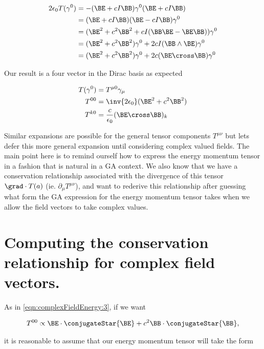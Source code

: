 \begin{align*}
2 \epsilon_0 T(\gamma^0) 
&= -(\BE + c I \BB) \gamma^0 (\BE + c I \BB) \\
&= (\BE + c I \BB) (\BE - c I \BB) \gamma^0 \\
&= (\BE^2 + c^2 \BB^2 + c I (\BB \BE - \BE \BB)) \gamma^0 \\
&= (\BE^2 + c^2 \BB^2) \gamma^0 + 2 c I ( \BB \wedge \BE ) \gamma^0 \\
&= (\BE^2 + c^2 \BB^2) \gamma^0 + 2 c ( \BE \cross \BB ) \gamma^0 \\
\end{align*}

Our result is a four vector in the Dirac basis as expected

\begin{subequations}
\begin{align}\label{eqn:complexFieldEnergy:7}
T(\gamma^0) &= T^{\mu 0} \gamma_\mu \\
T^{0 0} &= \inv{2 \epsilon_0} (\BE^2 + c^2 \BB^2) \\
T^{k 0} &= \frac{c}{\epsilon_0} (\BE \cross \BB)_k 
\end{align}
\end{subequations}

Similar expansions are possible for the general tensor components $T^{\mu\nu}$ but lets defer this more general expansion until considering complex valued fields.  The main point here is to remind ourself how to express the energy momentum tensor in a fashion that is natural in a GA context.  We also know that we have a conservation relationship associated with the divergence of this tensor $\grad \cdot T(a)$ (ie. $\partial_\mu T^{\mu\nu}$), and want to rederive this relationship after guessing what form the GA expression for the energy momentum tensor takes when we allow the field vectors to take complex values.

\section{Computing the conservation relationship for complex field vectors.}

As in \ref{eqn:complexFieldEnergy:3}, if we want 

\begin{align}\label{eqn:complexFieldEnergy:8}
T^{0 0} \propto \BE \cdot \conjugateStar{\BE} + c^2 \BB \cdot \conjugateStar{\BB},
\end{align}

it is reasonable to assume that our energy momentum tensor will take the form

